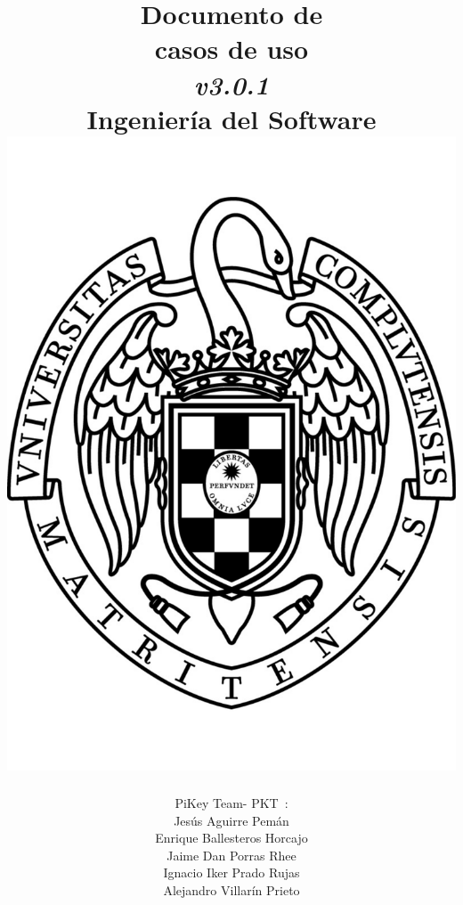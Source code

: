 \documentclass[spanish,a4paper,11pt, twoside]{report}	%
\newcommand*{\PKT}{\hbox{P}\kern-2.5pt\lower3.5pt\hbox{\small{K}}\kern-2.8pt\hbox{T}\kern-2pt}	%
\begin{document}
\title{\textbf{\huge{Documento de \\ 
	casos de uso}} \\ 
	\textit{v3.0.1} \\	\vspace{0.1cm}
	\Large{Ingeniería del Software} \\
	\includegraphics[scale=0.3]{ucm.pdf}}
\author{{\Large{PiKey Team-}} \PKT \ : \vspace{0.2cm} \\
	Jesús Aguirre Pemán \\
	 Enrique Ballesteros Horcajo \\
	 Jaime Dan Porras Rhee \\
	 Ignacio Iker Prado Rujas \\
	 Alejandro Villarín Prieto }
\date{\Today}
\maketitle
\end{document}
